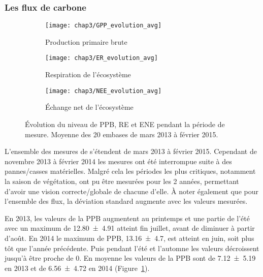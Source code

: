 \subsubsection{Les flux de carbone}

\begin{figure}
	\centering
	\begin{subfigure}[t]{\textwidth}
		\centering
		\texttt{[image: chap3/GPP\_evolution\_avg]}
		\caption{Production primaire brute}
		\label{fig:GPP_evolution_avg}
	\end{subfigure}%
	
	\begin{subfigure}[t]{\textwidth}
		\centering
		\texttt{[image: chap3/ER\_evolution\_avg]}
		\caption{Respiration de l'écosystème}
		\label{fig:ER_evolution_avg}
	\end{subfigure}
	
	\begin{subfigure}[t]{\textwidth}
		\centering
		\texttt{[image: chap3/NEE\_evolution\_avg]}
		\caption{Échange net de l'écosystème}
		\label{fig:NEE_evolution_avg}
	\end{subfigure}
\caption{Évolution du niveau de PPB, RE et ENE pendant la période de mesure. Moyenne des 20 embases de mars 2013 à février 2015.}
\label{fig:flux_evolution_avg}
\end{figure}

L'ensemble des mesures de \coo s'étendent de mars 2013 à février 2015.
Cependant de novembre 2013 à février 2014 les mesures ont été interrompue suite à des pannes/casses matérielles.
Malgré cela les périodes les plus critiques, notamment la saison de végétation, ont pu être mesurées pour les 2 années, permettant d'avoir une vision correcte/globale de chacune d'elle.
À noter également que pour l'ensemble des flux, la déviation standard augmente avec les valeurs mesurées.

En 2013, les valeurs de la PPB augmentent au printemps et une partie de l'été avec un maximum de \SI{12.80(491)}{\uml} atteint fin juillet, avant de diminuer à partir d'août.
En 2014 le maximum de PPB, \SI{13.16(470)}{\uml}, est atteint en juin, soit plus tôt que l'année précédente.
Puis pendant l'été et l'automne les valeurs décroissent jusqu'à être proche de 0.
En moyenne les valeurs de la PPB sont de \SI{7.12(519)}{\uml} en 2013 et de \SI{6.56(472)}{\uml} en 2014 (Figure~\ref{fig:GPP_evolution_avg}).

